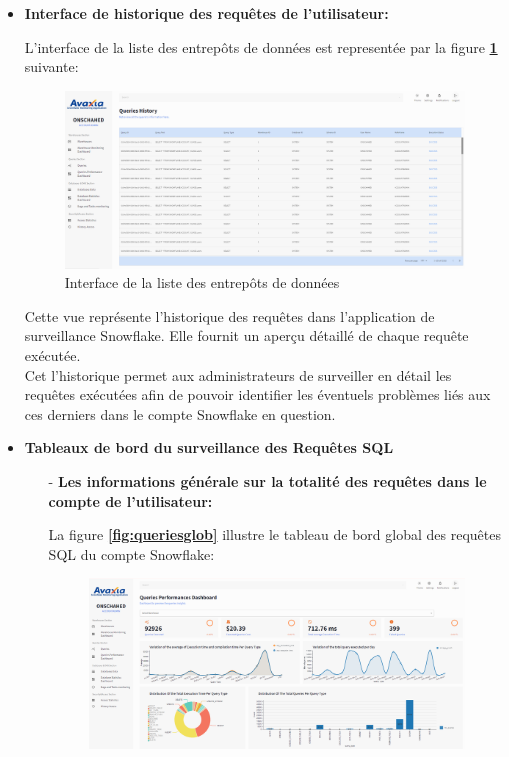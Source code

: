 \begin{itemize}
        \item \textbf{Interface de historique des requêtes de l'utilisateur:}
        \par L'interface de la liste des entrepôts de données est representée par la figure \textbf{\ref{fig:listqueries}} suivante:
        \begin{figure}[H]
            \centering
            \includegraphics[width =1\linewidth]{img/captures/queries/queries_list.png}
            \caption{Interface de la liste des entrepôts de données}
                \label{fig:listqueries}
            \end{figure}
            \par Cette vue représente l'historique des requêtes dans l'application de surveillance Snowflake.
             Elle fournit un aperçu détaillé de chaque requête exécutée. \\ 
             Cet l'historique permet aux administrateurs de surveiller en détail les requêtes exécutées afin de pouvoir identifier les éventuels problèmes liés aux ces derniers dans le compte Snowflake en question.
            \item \textbf{Tableaux de bord du surveillance des Requêtes SQL}
            \begin{enumerate}
                \item[-] \textbf{Les informations générale sur la totalité des requêtes dans le compte de l'utilisateur:  }
                    \par La figure \textbf{\ref{fig:queriesglob}} illustre le tableau de bord global des requêtes SQL du compte Snowflake:
                    \begin{figure}[H]
                        \centering
                        \includegraphics[width =1\linewidth]{img/captures/queries/global_queries_dash.png}

\end{figure}
\end{enumerate}
\end{itemize}
